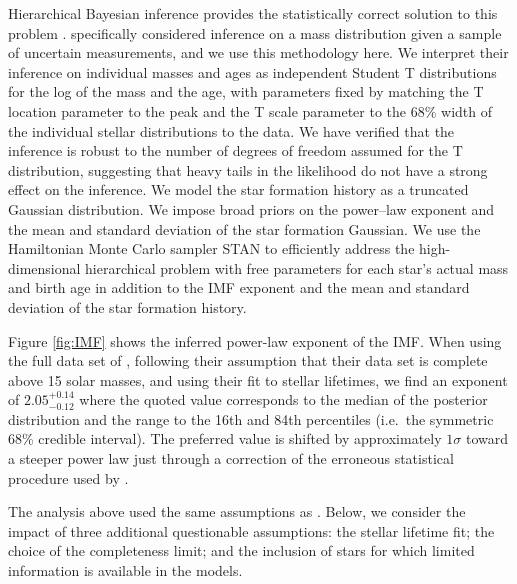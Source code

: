 \documentclass[apjl]{emulateapj}
\newcommand{\onesigrange}[3]{\ensuremath{#1^{+#2}_{-#3}}}
\newcommand{\alpharangeone}{\onesigrange{2.05}{0.14}{0.12}}
\begin{document}
Hierarchical Bayesian inference provides the statistically correct solution to
this problem \citep{Hogg:2010}.  \citet{Mandel:2010stat} specifically considered
inference on a mass distribution given a sample of uncertain measurements, and
we use this methodology here.  We interpret their inference
on individual masses and ages as independent Student T distributions for the log
of the mass and the age, with parameters fixed by matching the T location
parameter to the peak and the T scale parameter to the 68\% width of the
individual stellar distributions to the \citet{Schneider:2018} data.  We have
verified that the inference is robust to the number of degrees of freedom
assumed for the T distribution, suggesting that heavy
tails in the likelihood do not have a strong effect on the inference.  We model
the star formation history as a truncated Gaussian distribution.  We impose
broad priors on the power--law exponent and the mean and standard deviation of the
star formation Gaussian.    We use the Hamiltonian Monte Carlo sampler STAN
\citep{STAN} to efficiently address the high-dimensional hierarchical problem
with free parameters for each star's actual mass and birth age in addition to
the IMF exponent and the mean and standard deviation of the star formation history.

Figure \ref{fig:IMF} shows the inferred power-law exponent of the IMF.   When using the full data set of \citet{Schneider:2018}, following their assumption that their data set is complete above 15 solar masses, and using their fit to stellar lifetimes, we find an exponent of $\alpharangeone$ where the quoted value corresponds to the median of
the posterior distribution and the range to the 16th and 84th percentiles (i.e.\
the symmetric 68\% credible interval).   The preferred value is shifted by approximately $1 \sigma$ toward a steeper power law just through a correction of the erroneous statistical procedure used by \citet{Schneider:2018}.

The analysis above used the same assumptions as \citet{Schneider:2018}.  Below, we consider the impact of three additional questionable assumptions: the stellar lifetime fit; the choice of the completeness limit; and the inclusion of stars for which limited information is available in the models.
\end{document}
